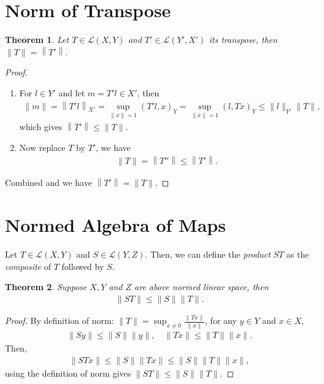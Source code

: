 \documentclass[11pt]{book}
\newtheorem{theorem}{Theorem}[section]
\theoremstyle{definition}
\numberwithin{equation}{chapter}
\begin{document}
\medskip

\section{Norm of Transpose}
\begin{theorem}
Let $T \in \mathscr{L}(X, Y)$ and $T' \in \mathscr{L}(Y', X')$ its transpose, then $\|T\| = \left\|T'\right\|$.
\end{theorem}
\begin{proof}
~\begin{enumerate}[label=(\alph*)]
    \item For $l \in Y'$ and let $m = T'l \in X'$, then
    \begin{align*}
        \|m\| = \left\|T'l\right\|_{X'} = \sup_{\|x\|=1} \left(T'l, x\right)_{Y} =  \sup_{\|x\|=1} \left(l, Tx\right)_{Y} \leq \|l\|_{Y'} \|T\|, 
    \end{align*}
    which gives $\left\|T'\right\| \leq \|T\|$.
    
    \item Now replace $T$ by $T'$, we have
    \begin{align*}
        \|T\| = \left\|T''\right\| \leq \left\|T'\right\|.
    \end{align*}
\end{enumerate}
Combined and we have $\left\|T'\right\| = \|T\|$.
\end{proof}

\medskip

\section{Normed Algebra of Maps}

Let $T \in \mathscr{L}(X, Y)$ and $S \in \mathscr{L}(Y, Z)$. Then, we can define the {\em product} $ST$ as the {\em composite} of $T$ followed by $S$.

\medskip

\begin{theorem}
Suppose $X, Y$ and $Z$ are above normed linear space, then 
\begin{align*}
    \|ST\| \leq \|S\| \|T\|.
\end{align*}
\end{theorem}
\begin{proof}
By definition of norm: $\|T\| = \sup_{x \neq 0} \frac{\|Tx\|}{\|x\|}$, for any $y \in Y$ and $x \in X$, 
\begin{align*}
    \|Sy\| \leq \|S\| \|y\|, \quad \|Tx\| \leq \|T\| \|x\|.
\end{align*}
Then,
\begin{align*}
    \|STx\| \leq \|S\| \|Tx\| \leq \|S\| \|T\| \|x\|,
\end{align*}
using the definition of norm gives $\|ST\| \leq \|S\| \|T\|$.
\end{proof}
\end{document}
